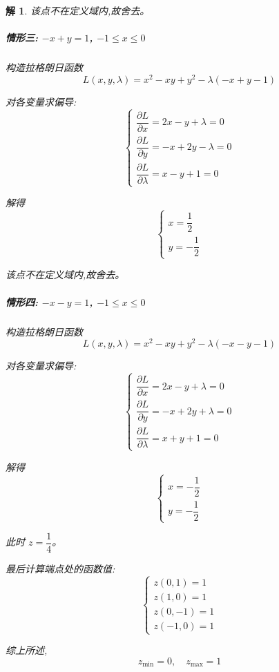 \documentclass[a4paper,12pt]{article}
\newtheorem*{sol}{解}
\begin{document}
\begin{sol}
    该点不在定义域内,故舍去。

    \subparagraph*{情形三: $-x+y=1$, $-1\leq x\leq 0$}

    构造拉格朗日函数
    $$L(x,y,\lambda)=x^2-xy+y^2-\lambda(-x+y-1)$$

    对各变量求偏导:
    $$\begin{cases}
            \dfrac{\partial L}{\partial x}=2x-y+\lambda=0  \\[8pt]
            \dfrac{\partial L}{\partial y}=-x+2y-\lambda=0 \\[8pt]
            \dfrac{\partial L}{\partial \lambda}=x-y+1=0
        \end{cases}$$

    解得
    $$\begin{cases}
            x=\dfrac{1}{2} \\[8pt]
            y=-\dfrac{1}{2}
        \end{cases}$$

    该点不在定义域内,故舍去。

    \subparagraph*{情形四: $-x-y=1$, $-1\leq x\leq 0$}

    构造拉格朗日函数
    $$L(x,y,\lambda)=x^2-xy+y^2-\lambda(-x-y-1)$$

    对各变量求偏导:
    $$\begin{cases}
            \dfrac{\partial L}{\partial x}=2x-y+\lambda=0  \\[8pt]
            \dfrac{\partial L}{\partial y}=-x+2y+\lambda=0 \\[8pt]
            \dfrac{\partial L}{\partial \lambda}=x+y+1=0
        \end{cases}$$

    解得
    $$\begin{cases}
            x=-\dfrac{1}{2} \\[8pt]
            y=-\dfrac{1}{2}
        \end{cases}$$

    此时 $z=\dfrac{1}{4}$。

    最后计算端点处的函数值:
    $$\begin{cases}
            z(0,1)=1  \\[8pt]
            z(1,0)=1  \\[8pt]
            z(0,-1)=1 \\[8pt]
            z(-1,0)=1
        \end{cases}$$

    综上所述,
    $$z_{\min}=0,\quad z_{\max}=1$$
\end{sol}
\end{document}

